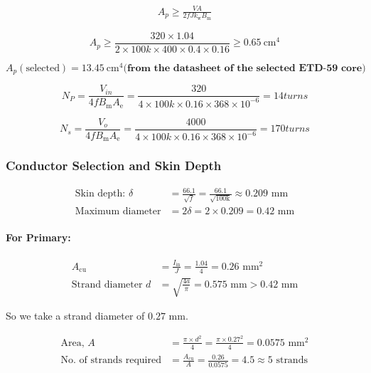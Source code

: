 \begin{equation}
\begin{aligned}
     A_p \ge \frac{V A}{2fJk_\text{w}B_\text{m}} 
\end{aligned}
\end{equation}

\[
     A_p \ge \frac{320 \times 1.04}{2\times 100k\times400\times0.4\times0.16} \ge 0.65~\text{cm}^4 
\]

\[   A_p (\text{selected}) = 13.45~\text{cm}^4 \textbf{(from the datasheet of the selected ETD-59 core)}\]

\[
    N_P=\frac{V_{in}}{4fB_\text{m}A_\text{e}}=\frac{320}{4\times 100k\times 0.16\times 368\times10^{-6}}= 14 turns
\]

\[
    N_s=\frac{V_{o}}{4fB_\text{m}A_\text{e}}=\frac{4000}{4\times 100k\times 0.16\times 368\times10^{-6}}= 170 turns
\]

\subsubsection{Conductor Selection and Skin Depth}
\begin{align*}
    \text{Skin depth: } \delta &= \frac{66.1}{\sqrt{f}} = \frac{66.1}{\sqrt{100\text{k}}} \approx 0.209 \text{ mm} \\
    \text{Maximum diameter} &= 2\delta = 2 \times 0.209 = 0.42 \text{ mm}
\end{align*}

\paragraph{For Primary:}
\begin{align*}
    A_{\text{cu}} &= \frac{I_{\text{in}}}{J} = \frac{1.04}{4} = 0.26 \text{ mm}^2 \\
    \text{Strand diameter } d &= \sqrt{\frac{4a}{\pi}} = 0.575 \text{ mm} > 0.42 \text{ mm}
\end{align*}

So we take a strand diameter of $0.27 \text{ mm}$. \par \raggedright

\begin{align*}
    \text{Area, } A &= \frac{\pi \times d^2}{4} = \frac{\pi \times 0.27^2}{4} = 0.0575 \text{ mm}^2 \\
    \text{No. of strands required} &= \frac{A_{\text{cu}}}{A} = \frac{0.26}{0.0575} = 4.5 \approx 5 \text{ strands}
\end{align*}


